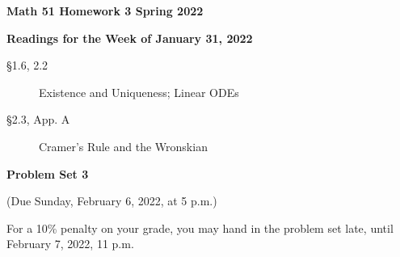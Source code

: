 \documentclass[12pt]{amsart}
\begin{document}
\thispagestyle{empty}
\noindent
\textbf{Math 51 \hfill Homework 3 \hfill Spring 2022}

\bigskip
\bigskip

\centerline{\textbf{Readings for the Week of January 31, 2022}}

\medskip
\begin{description}
\item[\S 1.6, 2.2] Existence and Uniqueness; Linear ODEs
\item[\S 2.3, App. A] Cramer’s Rule and the Wronskian
\end{description}

\bigskip
\noindent
\centerline{\textbf{Problem Set 3}}
\centerline{(Due Sunday, February 6, 2022, at 5 p.m.)}

\medskip

\noindent
For a 10\% penalty on your grade, you may hand in the problem set late, until February 7, 2022, 11 p.m.
\end{document}
